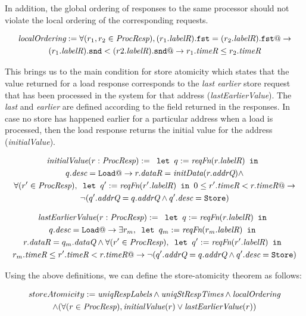 In addition, the global ordering of responses to the same processor should not
violate the local ordering of the corresponding requests.

\begin{defn}
\begin{multline*}
\textit{localOrdering} :=
\forall (r_1, r_2 \in \textit{ProcResp}), (r_1.\textit{labelR}).\texttt{fst} = (r_2.\textit{labelR}).\texttt{fst} @->\\
(r_1.\textit{labelR}).\texttt{snd} < (r2.\textit{labelR}).\texttt{snd} @-> r_1.\textit{timeR} \le r_2.\textit{timeR}
\end{multline*}
\end{defn}

This brings us to the main condition for store atomicity which states that the
value returned for a load response corresponds to the \emph{last earlier} store
request that has been processed in the system for that address
(\textit{lastEarlierValue}). The \emph{last} and \emph{earlier} are defined
according to the field \timeR{} returned in the responses. In case no store has
happened earlier for a particular address when a load is processed, then the
load response returns the initial value for the address (\textit{initialValue}).
\begin{defn}
\begin{multline*}
\textit{initialValue} (r: \textit{ProcResp}) := \texttt{ let } q := \textit{reqFn} (r.\textit{labelR}) \texttt{ in }\\
q.\textit{desc} = \texttt{Load} @-> r.\textit{dataR} = \textit{initData} (r.\textit{addrQ}) \wedge \\
\forall (r' \in \textit{ProcResp}), \texttt{ let } q' := \textit{reqFn} (r'.\textit{labelR}) \texttt{ in } 0 \le r'.\textit{timeR} < r.\textit{timeR} @->\\
\neg (q'.\textit{addrQ} = q.\textit{addrQ} \wedge q'.\textit{desc} = \texttt{Store})
\end{multline*}
\end{defn}

\begin{defn}
\begin{multline*}
\textit{lastEarlierValue} (r: \textit{ProcResp}) := \texttt{ let } q := \textit{reqFn} (r.\textit{labelR}) \texttt{ in }\\
q.\textit{desc} = \texttt{Load} @-> \exists r_m, \texttt{ let } q_m := \textit{reqFn} (r_m.\textit{labelR}) \texttt{ in }\\
r.\textit{dataR} = q_m.\textit{dataQ} \wedge
\forall (r' \in \textit{ProcResp}), \texttt{ let } q' := \textit{reqFn} (r'.\textit{labelR}) \texttt{ in } \\ r_m.\textit{timeR} \le r'.\textit{timeR} < r.\textit{timeR} @->
\neg (q'.\textit{addrQ} = q.\textit{addrQ} \wedge q'.\textit{desc} = \texttt{Store})
\end{multline*}
\end{defn}

Using the above definitions, we can define the store-atomicity theorem as follows:
\begin{thm}
\begin{multline*}
storeAtomicity := 
\textit{uniqRespLabels} \wedge
\textit{uniqStRespTimes} \wedge \textit{localOrdering}\\ \wedge 
(\forall (r \in \textit{ProcResp}), \textit{initialValue}(r) \vee \textit{lastEarlierValue}(r))
\end{multline*}
\end{thm}

